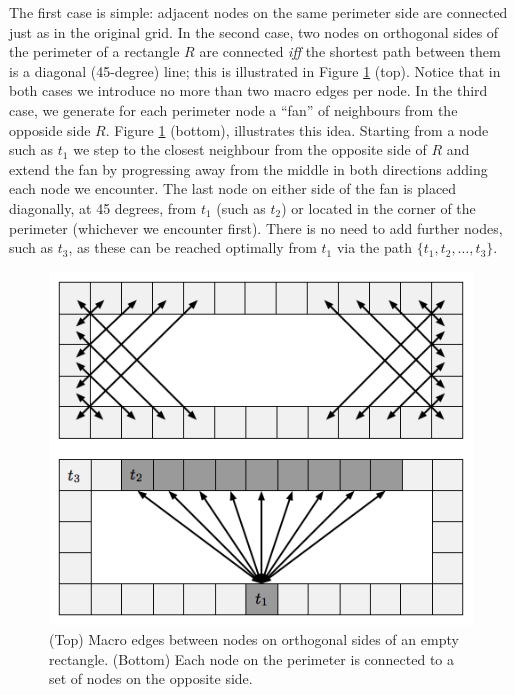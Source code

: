 The first case is simple: adjacent nodes on the same perimeter side are connected
just as in the original grid. 
In the second case, two nodes on orthogonal sides of the perimeter of a rectangle
$R$ are connected \emph{iff} the shortest path between them is a diagonal
(45-degree) line; this is illustrated in Figure \ref{fig-macroedges} (top).
Notice that in both cases we introduce no more than two macro edges per node.
In the third case, we generate for each perimeter node a ``fan'' of neighbours
from the opposide side $R$.  Figure \ref{fig-macroedges} (bottom), illustrates
this idea.  Starting from a node such as $t_{1}$ we step to the closest
neighbour from the opposite side of $R$ and extend the fan by progressing away
from the middle in both directions adding each node we encounter.  The last node
on either side of the fan is placed diagonally, at 45 degrees, from $t_{1}$
(such as $t_{2}$) or located in the corner of the perimeter (whichever we
encounter first).  There is no need to add further nodes, such as $t_{3}$, as
these can be reached optimally from $t_1$ via the path $\lbrace t_1, t_2, \dots,
t_3\rbrace$.

\begin{figure}[tb]
       \begin{center}
		   \includegraphics[scale=0.45, trim = 10mm 10mm 10mm 0mm]
			{diagrams/macroedges.png}
       \end{center}
	\vspace{-3pt}
       \caption{(Top) Macro edges between nodes on orthogonal sides of an empty
       rectangle. (Bottom) Each node on the perimeter is connected to a set of 
		nodes on the opposite side.}
       \label{fig-macroedges}
\end{figure}

